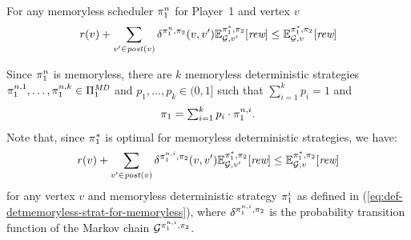 \begin{myproof}
  \begin{claim}
  For any memoryless scheduler $\pi_{1}^n$ for Player~1 and vertex $v$ 
  \begin{equation*}
    \mathit{r}(v) + \sum_{v' \in \mathit{post}(v)} \delta^{\pi_{1}^n,\pi_{2}}(v, v') \mathbb{E}^{\pi^*_{1}, \pi_{2}}_{\mathcal{G},v'}[\textit{rew}] \leq \mathbb{E}^{\pi^*_{1}, \pi_{2}}_{\mathcal{G},v}[\textit{rew}]
  \end{equation*}
  \end{claim}
  \begin{proofofclaim}
    Since $\pi_{1}^n$ is memoryless, there are $k$ memoryless
    deterministic strategies
    $\pi_{1}^{n,1},\ldots,\pi_{1}^{n,k}\in\Pi^{\textit{MD}}_{1}$ and
    $p_1,\ldots,p_k \in(0,1]$ such that $\sum_{i=1}^kp_i =1$ and 
    \begin{equation}\label{eq:def-detmemoryless-strat-for-memoryless}
      \pi_{1}=\textstyle\sum_{i=1}^k p_i\cdot\pi_{1}^{n,i}.
    \end{equation}
    Note that, since $\pi^*_{1}$ is optimal for memoryless
    deterministic strategies, we have:
    \begin{equation}\label{eq:semimarkov-to-detmemoryless:optimality}
      \mathit{r}(v) + \sum_{v' \in \mathit{post}(v)} \delta^{\pi_{1}^{n,i},\pi_{2}}(v, v') \mathbb{E}^{\pi^*_{1}, \pi_{2}}_{\mathcal{G},v'}[\textit{rew}] \leq \mathbb{E}^{\pi^*_{1}, \pi_{2}}_{\mathcal{G},v}[\textit{rew}]
    \end{equation}
    for any vertex $v$ and memoryless deterministic strategy
    $\pi_{1}^i$ as defined in
    (\ref{eq:def-detmemoryless-strat-for-memoryless}), where
    $\delta^{\pi_{1}^{n,i},\pi_{2}}$ is the probability transition
    function of the Markov chain $\mathcal{G}^{\pi_{1}^{n,i},\pi_{2}}$.


\end{proofofclaim}
\end{myproof}
